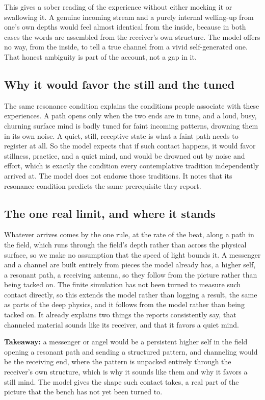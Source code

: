 This gives a sober reading of the experience without either mocking it or swallowing it. A genuine incoming stream and a purely internal welling-up from one's own depths would feel almost identical from the inside, because in both cases the words are assembled from the receiver's own structure. The model offers no way, from the inside, to tell a true channel from a vivid self-generated one. That honest ambiguity is part of the account, not a gap in it.

\subsection{Why it would favor the still and the tuned}

The same resonance condition explains the conditions people associate with these experiences. A path opens only when the two ends are in tune, and a loud, busy, churning surface mind is badly tuned for faint incoming patterns, drowning them in its own noise. A quiet, still, receptive state is what a faint path needs to register at all. So the model expects that if such contact happens, it would favor stillness, practice, and a quiet mind, and would be drowned out by noise and effort, which is exactly the condition every contemplative tradition independently arrived at. The model does not endorse those traditions. It notes that its resonance condition predicts the same prerequisite they report.

\subsection{The one real limit, and where it stands}

Whatever arrives comes by the one rule, at the rate of the beat, along a path in the field, which runs through the field's depth rather than across the physical surface, so we make no assumption that the speed of light bounds it. A messenger and a channel are built entirely from pieces the model already has, a higher self, a resonant path, a receiving antenna, so they follow from the picture rather than being tacked on. The finite simulation has not been turned to measure such contact directly, so this extends the model rather than logging a result, the same as parts of the deep physics, and it follows from the model rather than being tacked on. It already explains two things the reports consistently say, that channeled material sounds like its receiver, and that it favors a quiet mind.

\textbf{Takeaway:} a messenger or angel would be a persistent higher self in the field opening a resonant path and sending a structured pattern, and channeling would be the receiving end, where the pattern is unpacked entirely through the receiver's own structure, which is why it sounds like them and why it favors a still mind. The model gives the shape such contact takes, a real part of the picture that the bench has not yet been turned to.
